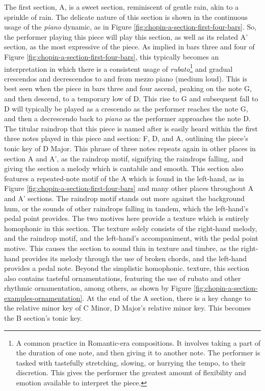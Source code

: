 The first section, A, is a sweet section, reminiscent of gentle rain, akin to a sprinkle of rain. The delicate nature of this section is shown in the continuous usage of the \textit{piano} dynamic, as in Figure \ref{fig:chopin-a-section-first-four-bars}\autocite{Hansen_1973}. So, the performer playing this piece will play this section, as well as its related A' section, as the most expressive of the piece. As implied in bars three and four of Figure \ref{fig:chopin-a-section-first-four-bars}\autocite{Hansen_1973}, this typically becomes an interpretation in which there is a consistent usage of \textit{rubato}\autocite{Cole_Schwartzb}\footnote{A common practice in Romantic-era compositions. It involves taking a part of the duration of one note, and then giving it to another note. The performer is tasked with tastefully stretching, slowing, or hurrying the tempo, to their discretion. This gives the performer the greatest amount of flexibility and emotion available to interpret the piece.} and gradual crescendos and decrescendos to and from mezzo piano (medium loud). This is best seen when the piece in bars three and four ascend, peaking on the note G, and then descend, to a temporary low of D. This rise to G and subsequent fall to D will typically be played as a crescendo as the performer reaches the note G, and then a decrescendo back to \textit{piano} as the performer approaches the note D. The titular raindrop that this piece is named after is easily heard within the first three notes played in this piece and section: F, D\musFlat{}, and A\musFlat{}, outlining the piece's tonic key of D\musFlat{} Major. This phrase of three notes repeats again in other places in section A and A', as the raindrop motif, signifying the raindrops falling, and giving the section a melody which is cantabile and smooth. This section also features a repeated-note motif of the A\musFlat{} which is found in the left-hand, as in Figure \ref{fig:chopin-a-section-first-four-bars}\autocite{Hansen_1973} and many other places throughout A and A' sections. The raindrop motif stands out more against the background hum, or the sounds of other raindrops falling in tandem, which the left-hand's pedal point provides. The two motives here provide a texture which is entirely homophonic in this section. The texture solely consists of the right-hand melody, and the raindrop motif, and the left-hand's accompaniment, with the pedal point motive. This causes the section to sound thin in texture and timbre, as the right-hand provides its melody through the use of broken chords, and the left-hand provides a pedal note. Beyond the simplistic homophonic. texture, this section also contains tasteful ornamentations, featuring the use of rubato and other rhythmic ornamentation, among others, as shown by Figure \ref{fig:chopin-a-section-examples-ornamentation}\autocite{Hansen_1973}. At the end of the A section, there is a key change to the relative minor key of C\musSharp{} Minor, D\musFlat{} Major's relative minor key. This becomes the B section's tonic key.

